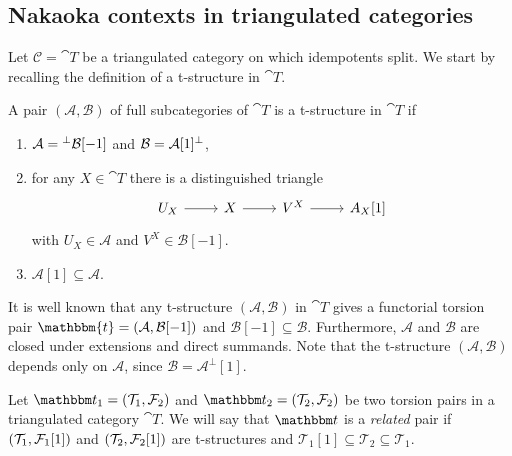 
\subsection{Nakaoka contexts in triangulated categories}

Let $\mathscr{C}=\cat{T}$ be a triangulated category on which idempotents split.
We start by recalling the definition of a t-structure in $\cat{T}$.

\begin{definition}
  A pair $(\mathcal{A},\mathcal{B})$ of full subcategories of $\cat{T}$ is a t-structure
  in $\cat{T}$ if
  \begin{enumerate}[label=(\alph*)]
    \item $\mathcal{A}={^\perp \mathcal{B}[-1]}$ and $\mathcal{B}=\mathcal{A}[1]^\perp$,
    \item for any $X\in\cat{T}$ there is a distinguished triangle
      \begin{equation*}
        \begin{tikzcd}
          U_X\arrow{r}& X\arrow{r}&V^X\arrow{r}&A_X[1]
        \end{tikzcd}
      \end{equation*}
      with $U_X\in\mathcal{A}$ and $V^X\in\mathcal{B}[-1]$.
    \item $\mathcal{A}[1]\subseteq \mathcal{A}$.
  \end{enumerate}
\end{definition}

\begin{rmk}
  It is well known that any t-structure $(\mathcal{A},\mathcal{B})$ in $\cat{T}$
  gives a functorial torsion pair $\mathbbm{t}=(\mathcal{A},\mathcal{B}[-1])$ and
  $\mathcal{B}[-1]\subseteq\mathcal{B}$. Furthermore, $\mathcal{A}$ and
  $\mathcal{B}$ are closed under extensions and direct summands. Note that the t-structure
  $(\mathcal{A},\mathcal{B})$ depends only on $\mathcal{A}$, since $\mathcal{B}=\mathcal{A}^\perp[1]$.
\end{rmk}

\begin{definition}\label{def:related_pair}
  Let $\t_1=(\T_1,\F_2)$ and $\t_2=(\T_2,\F_2)$ be two torsion pairs in a triangulated category $\cat{T}$.
  We will say that $\t$ is a \emph{related} pair if $(\mathcal{T}_1,\mathcal{F}_1[1])$ and $(\mathcal{T}_2,\mathcal{F}_2[1])$ are t-structures and
  $\mathcal{T}_1[1]\subseteq \mathcal{T}_2\subseteq\mathcal{T}_1$.
\end{definition}

